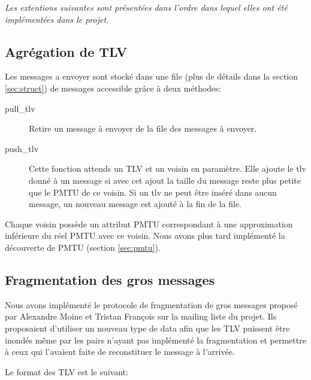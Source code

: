\documentclass[a4paper,10pt]{article} %
\begin{document}
\textit{Les extentions suivantes sont présentées dans l'ordre dans lequel elles ont été implémentées dans le projet.}

\subsection{Agrégation de TLV\label{sec:agrega}}
Les messages a envoyer sont stocké dans une file (plus de détails dans la section \ref{sec:struct}) de messages accessible grâce à deux méthodes:

\begin{description}
\item[pull\_tlv] Retire un message à envoyer de la file des messages à envoyer.
\item[push\_tlv] Cette fonction attends un TLV et un voisin en paramètre. Elle ajoute le tlv donné à un message si avec cet ajout la taille du message reste plus petite que le PMTU de ce voisin. Si un tlv ne peut être inséré dans aucun message, un nouveau message est ajouté à la fin de la file.
\end{description}

Chaque voisin possède un attribut \textrm{PMTU} correspondant à une approximation inférieure du réel \textrm{PMTU} avec ce voisin. Nous avons plus tard implémenté la découverte de PMTU (section \ref{sec:pmtu}).


\subsection{Fragmentation des gros messages\label{sec:frag}}
Nous avons implémenté le protocole de fragmentation de gros messages proposé par \textrm{Alexandre Moine} et \textrm{Tristan François} sur la mailing liste du projet. Ils proposaient d'utiliser un nouveau type de data afin que les TLV puissent être inondés même par les pairs n'ayant pas implémenté la fragmentation et permettre à ceux qui l'avaient faite de reconstituer le message à l'arrivée.

Le format des TLV est le suivant:
\end{document}
